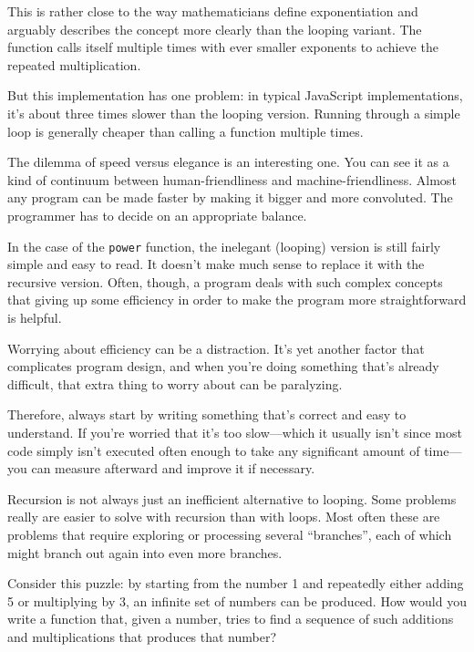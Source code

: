 This is rather close to the way mathematicians define exponentiation and arguably describes the concept more clearly than the looping variant. The function calls itself multiple times with ever smaller exponents to achieve the repeated multiplication.

But this implementation has one problem: in typical JavaScript implementations, it's about three times slower than the looping version. Running through a simple loop is generally cheaper than calling a function multiple times.

The dilemma of speed versus elegance is an interesting one. You can see it as a kind of continuum between human-friendliness and machine-friendliness. Almost any program can be made faster by making it bigger and more convoluted. The programmer has to decide on an appropriate balance.

In the case of the \lstinline`power` function, the inelegant (looping) version is still fairly simple and easy to read. It doesn't make much sense to replace it with the recursive version. Often, though, a program deals with such complex concepts that giving up some efficiency in order to make the program more straightforward is helpful.

Worrying about efficiency can be a distraction. It's yet another factor that complicates program design, and when you're doing something that's already difficult, that extra thing to worry about can be paralyzing.

Therefore, always start by writing something that's correct and easy to understand. If you're worried that it's too slow—which it usually isn't since most code simply isn't executed often enough to take any significant amount of time—you can measure afterward and improve it if necessary.

Recursion is not always just an inefficient alternative to looping. Some problems really are easier to solve with recursion than with loops. Most often these are problems that require exploring or processing several ``branches'', each of which might branch out again into even more branches.

\label{functions.recursive_puzzle}Consider this puzzle: by starting from the number 1 and repeatedly either adding 5 or multiplying by 3, an infinite set of numbers can be produced. How would you write a function that, given a number, tries to find a sequence of such additions and multiplications that produces that number?

